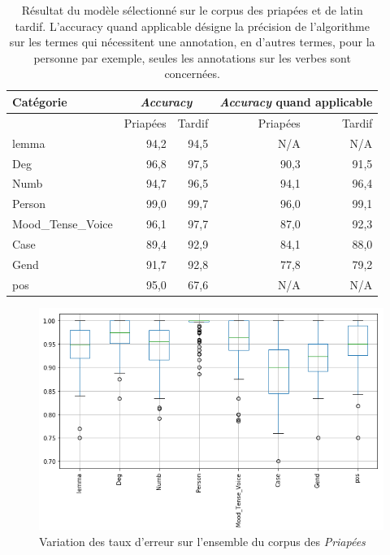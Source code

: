 \begin{table}[h]
    \centering
    \begin{tabular}{l|rr|rr}
    \toprule
         Catégorie &  \multicolumn{2}{c}{\textit{Accuracy}} & \multicolumn{2}{c}{\textit{Accuracy} quand applicable} \\
    \midrule    
                {} &  Priapées &    Tardif                  & Priapées &    Tardif                                   \\
    \midrule
             lemma &     94,2 &    94,5                   &   N/A    &    N/A                                      \\
               Deg &     96,8 &    97,5                   &   90,3   &    91,5                                     \\
              Numb &     94,7 &    96,5                   &   94,1   &    96,4                                     \\
            Person &     99,0 &    99,7                   &   96,0   &    99,1                                     \\
Mood\_Tense\_Voice &     96,1 &    97,7                   &   87,0   &    92,3                                     \\
              Case &     89,4 &    92,9                   &   84,1   &    88,0                                     \\
              Gend &     91,7 &    92,8                   &   77,8   &    79,2                                     \\
               pos &     95,0 &    67,6                   &   N/A    &    N/A                                      \\
    \bottomrule
    \end{tabular}
    \caption{Résultat du modèle sélectionné sur le corpus des priapées et de latin tardif. L'accuracy quand applicable désigne la précision de l'algorithme sur les termes qui nécessitent une annotation, en d'autres termes, pour la personne par exemple, seules les annotations sur les verbes sont concernées.}
    \label{tab:out_of_domain_global_accuracy}
\end{table}


\begin{figure}[ht]
    \centering
    \includegraphics[width=0.7\linewidth]{results/lemmatisation/extensibilite/PriapeaBoxPlot.png}
    \caption{Variation des taux d'erreur sur l'ensemble du corpus des \textit{Priapées}}
    \label{fig:priapea_varations_boxplot}
\end{figure}

